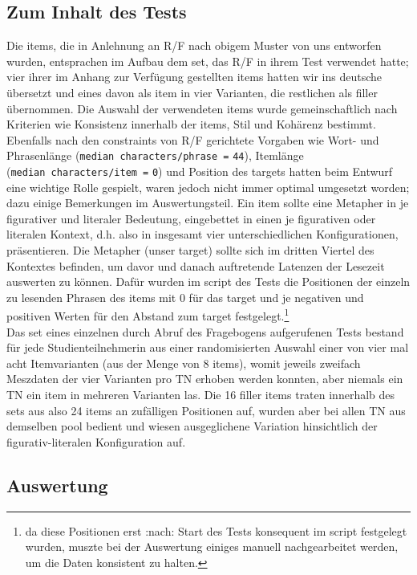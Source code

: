 \documentclass[
]{article}
\begin{document}
\hypertarget{zum-inhalt-des-tests}{%
\subsection{Zum Inhalt des Tests}\label{zum-inhalt-des-tests}}

Die items, die in Anlehnung an R/F nach obigem Muster von uns entworfen wurden, entsprachen im Aufbau dem set, das R/F in ihrem Test verwendet hatte; vier ihrer im Anhang zur Verfügung gestellten items hatten wir ins deutsche übersetzt und eines davon als item in vier Varianten, die restlichen als filler übernommen. Die Auswahl der verwendeten items wurde gemeinschaftlich nach Kriterien wie Konsistenz innerhalb der items, Stil und Kohärenz bestimmt. Ebenfalls nach den constraints von R/F gerichtete Vorgaben wie Wort- und Phrasenlänge (\texttt{median\ characters/phrase\ =} \texttt{44}), Itemlänge (\texttt{median\ characters/item\ =} \texttt{0}) und Position des targets hatten beim Entwurf eine wichtige Rolle gespielt, waren jedoch nicht immer optimal umgesetzt worden; dazu einige Bemerkungen im Auswertungsteil. Ein item sollte eine Metapher in je figurativer und literaler Bedeutung, eingebettet in einen je figurativen oder literalen Kontext, d.h. also in insgesamt vier unterschiedlichen Konfigurationen, präsentieren. Die Metapher (unser target) sollte sich im dritten Viertel des Kontextes befinden, um davor und danach auftretende Latenzen der Lesezeit auswerten zu können. Dafür wurden im script des Tests die Positionen der einzeln zu lesenden Phrasen des items mit 0 für das target und je negativen und positiven Werten für den Abstand zum target festgelegt.\footnote{da diese Positionen erst :nach: Start des Tests konsequent im script festgelegt wurden, muszte bei der Auswertung einiges manuell nachgearbeitet werden, um die Daten konsistent zu halten.}\\
Das set eines einzelnen durch Abruf des Fragebogens aufgerufenen Tests bestand für jede Studienteilnehmerin aus einer randomisierten Auswahl einer von vier mal acht Itemvarianten (aus der Menge von 8 items), womit jeweils zweifach Meszdaten der vier Varianten pro TN erhoben werden konnten, aber niemals ein TN ein item in mehreren Varianten las.
Die 16 filler items traten innerhalb des sets aus also 24 items an zufälligen Positionen auf, wurden aber bei allen TN aus demselben pool bedient und wiesen ausgeglichene Variation hinsichtlich der figurativ-literalen Konfiguration auf.

\hypertarget{auswertung}{%
\subsection{Auswertung}\label{auswertung}}
\end{document}
